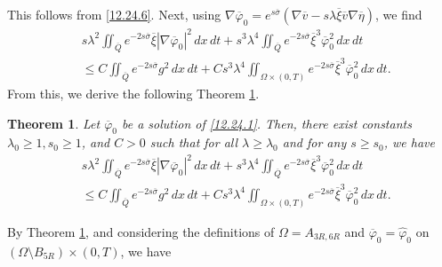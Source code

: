 \documentclass[11pt]{article}
\newtheorem{theorem}{Theorem}[section]
\numberwithin{equation}{section}
\begin{document}
This follows from \eqref{12.24.6}.
Next, using $\nabla \overline{\varphi}_0 = e^{s\overline{\sigma}} (\nabla \overline{v} - s\lambda \overline{\xi} \overline{v} \nabla \overline{\eta})$, we find
\begin{equation*}
	\begin{split}
		&s\lambda^2 \iint_{\overline{Q}} e^{-2s\overline{\sigma}} \overline{\xi} |\nabla \overline{\varphi}_0|^2 \, dx \, dt + s^3\lambda^4 \iint_{\overline{Q}} e^{-2s\overline{\sigma}} \overline{\xi}^3 \overline{\varphi}_0^2 \, dx \, dt \\
		&\leq C\iint_{\overline{Q}} e^{-2s\overline{\sigma}} g^2 \, dx \, dt + Cs^3\lambda^4 \iint_{\Omega \times (0,T)} e^{-2s\overline{\sigma}} \overline{\xi}^3 \overline{\varphi}_0^2 \, dx \, dt.
	\end{split}
\end{equation*}
From this, we derive the following Theorem \ref{12.24.T1}.
\begin{theorem}\label{12.24.T1}
	Let $\overline{\varphi}_0$ be a solution of \eqref{12.24.1}. Then, there exist constants $\lambda_0 \geq 1, s_0 \geq 1$, and $C > 0$ such that for all $\lambda \geq \lambda_0$ and for any $s \geq s_0$, we have
	\begin{equation}\label{12.24.8}
		\begin{split}
			&s\lambda^2 \iint_{\overline{Q}} e^{-2s\overline{\sigma}} \overline{\xi} |\nabla \overline{\varphi}_0|^2 \, dx \, dt + s^3\lambda^4 \iint_{\overline{Q}} e^{-2s\overline{\sigma}} \overline{\xi}^3 \overline{\varphi}_0^2 \, dx \, dt \\
			&\leq C\iint_{\overline{Q}} e^{-2s\overline{\sigma}} g^2 \, dx \, dt + Cs^3\lambda^4 \iint_{\Omega \times (0,T)} e^{-2s\overline{\sigma}} \overline{\xi}^3 \overline{\varphi}_0^2 \, dx \, dt.
		\end{split}
	\end{equation}
\end{theorem}
By Theorem \ref{12.24.T1}, and considering the definitions of $\Omega = A_{3R,6R}$ and $\overline{\varphi}_0 = \widehat{\varphi}_0$ on $(\Omega \setminus B_{5R}) \times (0,T)$, we have
\end{document}
